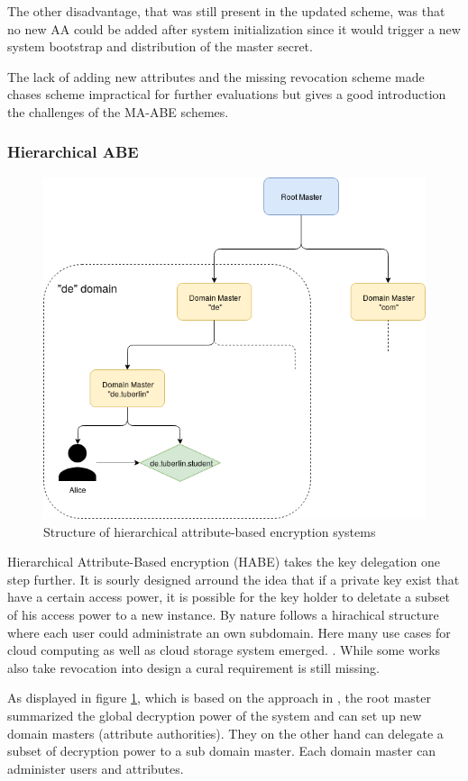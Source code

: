 The other disadvantage, that was still present in the updated scheme, was that no new \ac{AA} could be added after system initialization since it would trigger a new system bootstrap and distribution of the master secret. 

The lack of adding new attributes and the missing revocation scheme made chases scheme impractical for further evaluations but gives a good introduction the challenges of the \ac{MA-ABE} schemes.

\subsubsection{Hierarchical \ac{ABE}}
\label{sec:HABE}

\begin{figure}[!ht]
\centering
    \includegraphics[width=0.5\linewidth]{img/HABE.png}
    \caption{Structure of hierarchical attribute-based encryption systems}
    \label{fig:habe}
\end{figure}

Hierarchical Attribute-Based encryption (\ac{HABE}) takes the key delegation one step further. It is sourly designed arround the idea that if a private key exist that have a certain access power, it is possible for the key holder to deletate a subset of his access power to a new instance. By nature follows a hirachical structure where each user could administrate an own subdomain. Here many use cases for cloud computing as well as cloud storage system emerged. \cite{Wang:2010:HAE:1866307.1866414}. While some works also take revocation into design a cural requirement is still missing.

As displayed in figure \ref{fig:habe}, which is based on the approach in \cite{wang2011hierarchical}, the root master summarized the global decryption power of the system and can set up new domain masters (attribute authorities). They on the other hand can delegate a subset of decryption power to a sub domain master. Each domain master can administer users and attributes.

